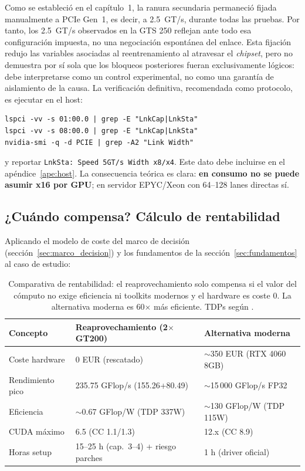 Como se estableció en el capítulo~1, la ranura secundaria permaneció fijada manualmente a PCIe Gen~1, es decir, a 2.5~GT/s, durante todas las pruebas. Por tanto, los 2.5~GT/s observados en la GTS 250 reflejan ante todo esa configuración impuesta, no una negociación espontánea del enlace. Esta fijación redujo las variables asociadas al reentrenamiento al atravesar el \textit{chipset}, pero no demuestra por sí sola que los bloqueos posteriores fueran exclusivamente lógicos: debe interpretarse como un control experimental, no como una garantía de aislamiento de la causa. La verificación definitiva, recomendada como protocolo, es ejecutar en el host:
\begin{lstlisting}[style=bash]
lspci -vv -s 01:00.0 | grep -E "LnkCap|LnkSta"
lspci -vv -s 08:00.0 | grep -E "LnkCap|LnkSta"
nvidia-smi -q -d PCIE | grep -A2 "Link Width"
\end{lstlisting}
y reportar \texttt{LnkSta: Speed 5GT/s Width x8/x4}. Este dato debe incluirse en el apéndice~\ref{ape:host}. La consecuencia teórica es clara: \textbf{en consumo no se puede asumir x16 por GPU}; en servidor EPYC/Xeon con 64--128 lanes directas \cite{pcisig2022} sí.

\subsection{¿Cuándo compensa? Cálculo de rentabilidad}

Aplicando el modelo de coste del marco de decisión (sección~\ref{sec:marco_decision}) y los fundamentos de la sección~\ref{sec:fundamentos} al caso de estudio:

\begin{table}[htbp]
\centering
\small
\begin{tabular}{|l|l|l|}
\hline
\textbf{Concepto} & \textbf{Reaprovechamiento (2$\times$ GT200)} & \textbf{Alternativa moderna} \\
\hline
Coste hardware & 0 EUR (rescatado) & $\sim$350 EUR (RTX 4060 8GB) \\
\hline
Rendimiento pico & 235.75 GFlop/s (155.26+80.49) & $\sim$15\,000 GFlop/s FP32 \\
\hline
Eficiencia & $\sim$0.67 GFlop/W (TDP 337W) & $\sim$130 GFlop/W (TDP 115W) \\
\hline
CUDA máximo & 6.5 (CC 1.1/1.3) & 12.x (CC 8.9) \\
\hline
Horas setup & 15--25 h (cap.~3--4) + riesgo parches & 1 h (driver oficial) \\
\hline
\end{tabular}
\caption{Comparativa de rentabilidad: el reaprovechamiento solo compensa si el valor del cómputo no exige eficiencia ni toolkits modernos y el hardware es coste 0. La alternativa moderna es 60$\times$ más eficiente. TDPs según \cite{nvidia_legacy_gpus}.}
\label{tab:rentabilidad}
\end{table}

